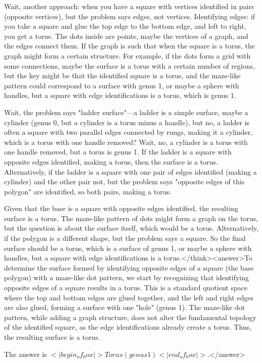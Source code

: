 Wait, another approach: when you have a square with vertices identified in pairs (opposite vertices), but the problem says edges, not vertices. Identifying edges: if you take a square and glue the top edge to the bottom edge, and left to right, you get a torus. The dots inside are points, maybe the vertices of a graph, and the edges connect them. If the graph is such that when the square is a torus, the graph might form a certain structure. For example, if the dots form a grid with some connections, maybe the surface is a torus with a certain number of regions, but the key might be that the identified square is a torus, and the maze-like pattern could correspond to a surface with genus 1, or maybe a sphere with handles, but a square with edge identifications is a torus, which is genus 1.

Wait, the problem says "ladder surface"—a ladder is a simple surface, maybe a cylinder (genus 0, but a cylinder is a torus minus a handle), but no, a ladder is often a square with two parallel edges connected by rungs, making it a cylinder, which is a torus with one handle removed? Wait, no, a cylinder is a torus with one handle removed, but a torus is genus 1. If the ladder is a square with opposite edges identified, making a torus, then the surface is a torus. Alternatively, if the ladder is a square with one pair of edges identified (making a cylinder) and the other pair not, but the problem says "opposite edges of this polygon" are identified, so both pairs, making a torus.

Given that the base is a square with opposite edges identified, the resulting surface is a torus. The maze-like pattern of dots might form a graph on the torus, but the question is about the surface itself, which would be a torus. Alternatively, if the polygon is a different shape, but the problem says a square. So the final surface should be a torus, which is a surface of genus 1, or maybe a sphere with handles, but a square with edge identifications is a torus.</think><answer>To determine the surface formed by identifying opposite edges of a square (the base polygon) with a maze-like dot pattern, we start by recognizing that identifying opposite edges of a square results in a torus. This is a standard quotient space where the top and bottom edges are glued together, and the left and right edges are also glued, forming a surface with one "hole" (genus 1). The maze-like dot pattern, while adding a graph structure, does not alter the fundamental topology of the identified square, as the edge identifications already create a torus. Thus, the resulting surface is a torus.

The answer is \(<|begin_of_box|>Torus (genus 1)<|end_of_box|>\).</answer>